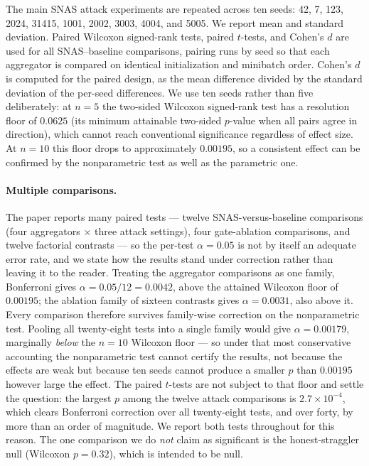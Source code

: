 \documentclass[pdflatex,sn-mathphys-num]{sn-jnl}
\begin{document}
The main SNAS attack experiments are repeated across ten seeds: 42, 7, 123, 2024, 31415, 1001, 2002, 3003, 4004, and 5005. We report mean and standard deviation. Paired Wilcoxon signed-rank tests, paired $t$-tests, and Cohen's $d$ are used for all SNAS--baseline comparisons, pairing runs by seed so that each aggregator is compared on identical initialization and minibatch order. Cohen's $d$ is computed for the paired design, as the mean difference divided by the standard deviation of the per-seed differences. We use ten seeds rather than five deliberately: at $n=5$ the two-sided Wilcoxon signed-rank test has a resolution floor of $0.0625$ (its minimum attainable two-sided $p$-value when all pairs agree in direction), which cannot reach conventional significance regardless of effect size. At $n=10$ this floor drops to approximately $0.00195$, so a consistent effect can be confirmed by the nonparametric test as well as the parametric one.

\paragraph{Multiple comparisons.} The paper reports many paired tests --- twelve SNAS-versus-baseline comparisons (four aggregators $\times$ three attack settings), four gate-ablation comparisons, and twelve factorial contrasts --- so the per-test $\alpha=0.05$ is not by itself an adequate error rate, and we state how the results stand under correction rather than leaving it to the reader. Treating the aggregator comparisons as one family, Bonferroni gives $\alpha=0.05/12=0.0042$, above the attained Wilcoxon floor of $0.00195$; the ablation family of sixteen contrasts gives $\alpha=0.0031$, also above it. Every comparison therefore survives family-wise correction on the nonparametric test. Pooling all twenty-eight tests into a single family would give $\alpha=0.00179$, marginally \emph{below} the $n=10$ Wilcoxon floor --- so under that most conservative accounting the nonparametric test cannot certify the results, not because the effects are weak but because ten seeds cannot produce a smaller $p$ than $0.00195$ however large the effect. The paired $t$-tests are not subject to that floor and settle the question: the largest $p$ among the twelve attack comparisons is $2.7\times10^{-4}$, which clears Bonferroni correction over all twenty-eight tests, and over forty, by more than an order of magnitude. We report both tests throughout for this reason. The one comparison we do \emph{not} claim as significant is the honest-straggler null (Wilcoxon $p=0.32$), which is intended to be null.
\end{document}
